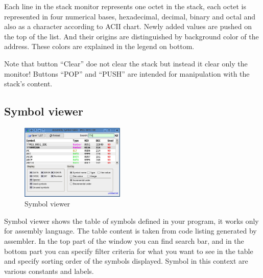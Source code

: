\documentclass[a4paper,twoside,12pt]{book}
\begin{document}
			Each line in the stack monitor represents one octet in the stack, each octet is represented in four numerical bases, hexadecimal, decimal, binary and octal and also as a character according to ACII chart. Newly added values are pushed on the top of the list. And their origins are distinguished by background color of the address. These colors are explained in the legend on bottom.

			Note that button ``Clear'' doe not clear the stack but instead it clear only the monitor! Buttons ``POP'' and ``PUSH'' are intended for manipulation with the stack's content.

		\subsection{Symbol viewer}
			\begin{figure}
				\centering{}
				\includegraphics[width=140pt]{img/019.png}
				\caption{Symbol viewer}
			\end{figure}
			Symbol viewer shows the table of symbols defined in your program, it works only for assembly language. The table content is taken from code listing generated by assembler. In the top part of the window you can find search bar, and in the bottom part you can specify filter criteria for what you want to see in the table and specify sorting order of the symbols displayed. Symbol in this context are various constants and labels.
\end{document}
